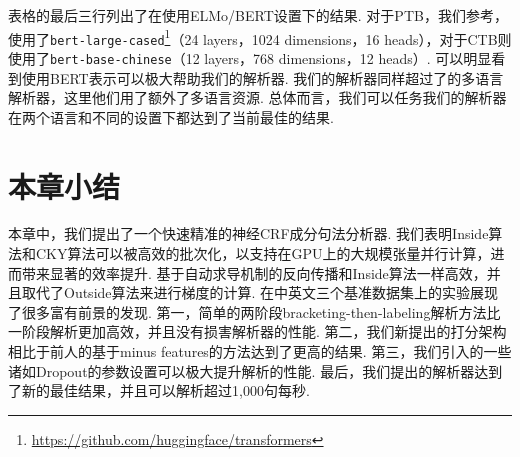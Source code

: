 表格的最后三行列出了在使用ELMo/BERT设置下的结果.
对于PTB，我们参考\cite{kitaev-etal-2019-multilingual}，使用了\texttt{bert-large-cased}\footnote{\url{https://github.com/huggingface/transformers}}（24 layers，1024 dimensions，16 heads），对于CTB则使用了\texttt{bert-base-chinese}（12 layers，768 dimensions，12 heads）.
可以明显看到使用BERT表示可以极大帮助我们的解析器.
我们的解析器同样超过了\cite{kitaev-etal-2019-multilingual}的多语言解析器，这里他们用了额外了多语言资源.
总体而言，我们可以任务我们的解析器在两个语言和不同的设置下都达到了当前最佳的结果.

\section{本章小结}\label{sec:con-conclusions}

本章中，我们提出了一个快速精准的神经CRF成分句法分析器.
我们表明Inside算法和CKY算法可以被高效的批次化，以支持在GPU上的大规模张量并行计算，进而带来显著的效率提升.
基于自动求导机制的反向传播和Inside算法一样高效，并且取代了Outside算法来进行梯度的计算.
在中英文三个基准数据集上的实验展现了很多富有前景的发现.
第一，简单的两阶段bracketing-then-labeling解析方法比一阶段解析更加高效，并且没有损害解析器的性能.
第二，我们新提出的打分架构相比于前人的基于minus features的方法达到了更高的结果.
第三，我们引入的一些诸如Dropout的参数设置可以极大提升解析的性能.
最后，我们提出的解析器达到了新的最佳结果，并且可以解析超过1,000句每秒.
